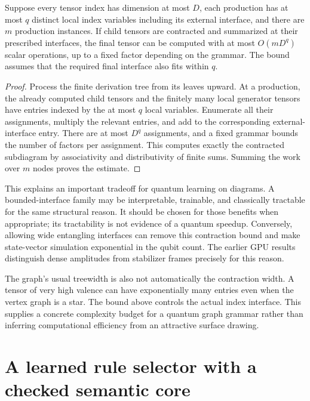 \begin{proposition}
Suppose every tensor index has dimension at most $D$, each production has at most $q$ distinct local index variables including its external interface, and there are $m$ production instances. If child tensors are contracted and summarized at their prescribed interfaces, the final tensor can be computed with at most $O(mD^q)$ scalar operations, up to a fixed factor depending on the grammar. The bound assumes that the required final interface also fits within $q$.
\end{proposition}
\begin{proof}
Process the finite derivation tree from its leaves upward. At a production, the already computed child tensors and the finitely many local generator tensors have entries indexed by the at most $q$ local variables. Enumerate all their assignments, multiply the relevant entries, and add to the corresponding external-interface entry. There are at most $D^q$ assignments, and a fixed grammar bounds the number of factors per assignment. This computes exactly the contracted subdiagram by associativity and distributivity of finite sums. Summing the work over $m$ nodes proves the estimate.
\end{proof}

This explains an important tradeoff for quantum learning on diagrams. A bounded-interface family may be interpretable, trainable, and classically tractable for the same structural reason. It should be chosen for those benefits when appropriate; its tractability is not evidence of a quantum speedup. Conversely, allowing wide entangling interfaces can remove this contraction bound and make state-vector simulation exponential in the qubit count. The earlier GPU results distinguish dense amplitudes from stabilizer frames precisely for this reason.

The graph's usual treewidth is also not automatically the contraction width. A tensor of very high valence can have exponentially many entries even when the vertex graph is a star. The bound above controls the actual index interface. This supplies a concrete complexity budget for a quantum graph grammar rather than inferring computational efficiency from an attractive surface drawing.

\section{A learned rule selector with a checked semantic core}

